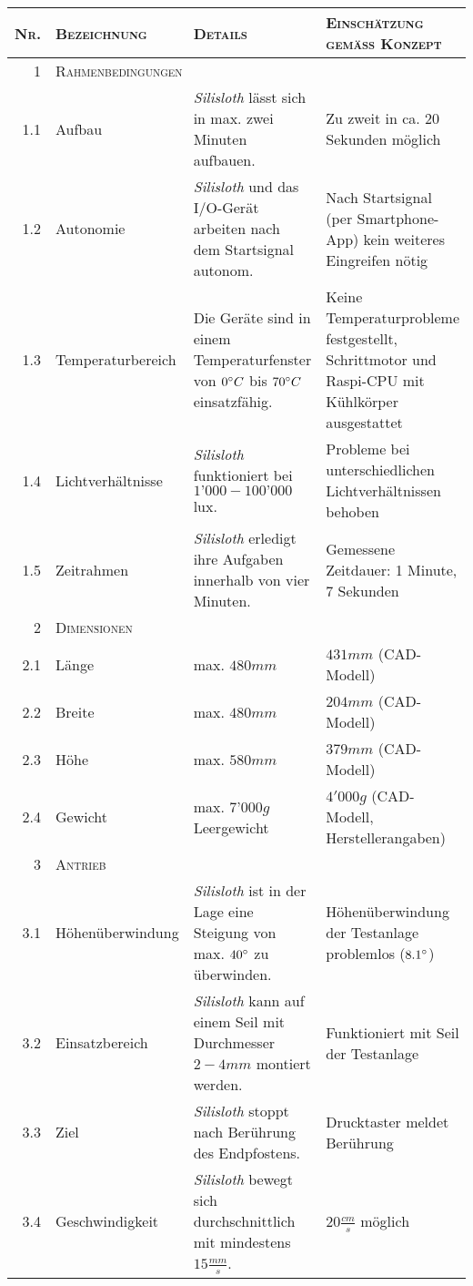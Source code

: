 {\footnotesize
\begin{longtable}{|r|p{2cm}|p{5cm}|p{5.5cm}|}
\hline
\textsc{Nr.} & \textsc{Bezeichnung} & \textsc{Details} & \textsc{Einschätzung gemäss Konzept} \\
\hline
    \textsc{1} & \multicolumn{3}{l|}{\textsc{Rahmenbedingungen}} \\
    \hline
    1.1 & Aufbau  & \textit{Silisloth} lässt sich in max. zwei Minuten aufbauen. & Zu zweit in ca. 20 Sekunden möglich \\
    1.2 & Autonomie & \textit{Silisloth} und das I/O-Gerät arbeiten nach dem Startsignal autonom. & Nach Startsignal (per Smartphone-App) kein weiteres Eingreifen nötig \\
    1.3 & Temperaturbe\-reich & Die Geräte sind in einem Temperaturfenster von $0\degree C$ bis $70\degree C$ einsatzfähig. & Keine Temperaturprobleme festgestellt, Schrittmotor und Raspi-CPU mit Kühlkörper ausgestattet \\
1.4 & Lichtverhältnisse & \textit{Silisloth} funktioniert bei $1’000-100’000$ lux. & Probleme bei unterschiedlichen Lichtverhältnissen behoben \\
    1.5 & Zeitrahmen & \textit{Silisloth} erledigt ihre Aufgaben innerhalb von vier Minuten. & Gemessene Zeitdauer: 1 Minute, 7 Sekunden \\
    \hline
    \textsc{2} & \multicolumn{3}{l|}{\textsc{Dimensionen}} \\
    \hline
    2.1 & Länge & max. $480mm$ & $431mm$ (CAD-Modell) \\
    2.2 & Breite & max. $480mm$ & $204mm$ (CAD-Modell) \\
    2.3 & Höhe & max. $580mm$ & $379mm$ (CAD-Modell) \\
    2.4 & Gewicht & max. $7’000g$ Leergewicht & $4'000g$ (CAD-Modell, Herstellerangaben) \\
    \hline
    \textsc{3} & \multicolumn{3}{l|}{\textsc{Antrieb}} \\
    \hline
    3.1 & Höhenüberwin\-dung & \textit{Silisloth} ist in der Lage eine Steigung von max. $40\degree$ zu überwinden. & Höhenüberwindung der Testanlage problemlos ($8.1\degree$) \\
    3.2 & Einsatzbereich & \textit{Silisloth} kann auf einem Seil mit Durchmesser $2-4mm$ montiert werden. & Funktioniert mit Seil der Testanlage \\
3.3 & Ziel & \textit{Silisloth} stoppt nach Berührung des Endpfostens. & Drucktaster meldet Berührung \\
    3.4 & Geschwindigkeit  & \textit{Silisloth} bewegt sich durchschnittlich mit mindestens $15\frac{mm}{s}$. & $20\frac{cm}{s}$ möglich \\

\end{longtable}}
